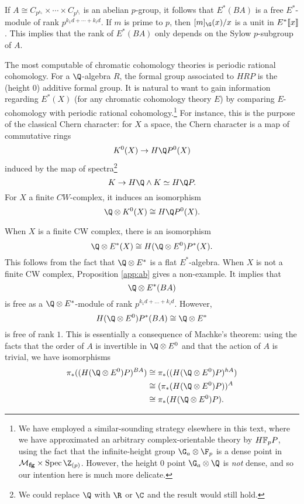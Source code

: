 If $A \cong C_{p^{k_1}} \times \cdots \times C_{p^{k_i}}$ is an abelian $p$-group, it follows that $E^*(BA)$ is a free $E^*$-module of rank $p^{k_1d+\cdots + k_id}$. If $m$ is prime to $p$, then $[m]_{\G}(x)/x$ is a unit in $E^*\llbracket{x}\rrbracket$. This implies that the rank of $E^*(BA)$ only depends on the Sylow $p$-subgroup of $A$.

The most computable of chromatic cohomology theories is periodic rational cohomology. For a $\Q$-algebra $R$, the formal group associated to $HRP$ is the (height $0$) additive formal group. It is natural to want to gain information regarding $E^*(X)$ (for any chromatic cohomology theory $E$) by comparing $E$-cohomology with periodic rational cohomology.\footnote{We have employed a similar-sounding strategy elsewhere in this text, where we have approximated an arbitrary complex-orientable theory by $\HFp P$, using the fact that the infinite-height group $\G_a \otimes \F_p$ is a dense point in $\moduli{fg} \times \Spec \Z_{(p)}$.  However, the height $0$ point $\G_a \otimes \Q$ is \emph{not} dense, and so our intention here is much more delicate.}  For instance, this is the purpose of the classical Chern character: for $X$ a space, the Chern character is a map of commutative rings
\[
K^0(X) \to H\Q P^0(X)
\] 
induced by the map of spectra\footnote{We could replace $\Q$ with $\R$ or $\C$ and the result would still hold.} \[K \to H\Q \wedge K \simeq H\Q P.\] For $X$ a finite $CW$-complex, it induces an isomorphism
\[
\Q \otimes K^0(X) \cong H\Q P^0(X).
\]

When $X$ is a finite CW complex, there is an isomorphism
\begin{equation*}
\Q \otimes E^*(X) \cong H(\Q \otimes E^0)P^*(X).
\end{equation*}
This follows from the fact that $\Q \otimes E^*$ is a flat $E^*$-algebra. When $X$ is not a finite CW complex, Proposition \ref{app:ab} gives a non-example. It implies that
\[
\Q \otimes E^*(BA)
\]
is free as a $\Q \otimes E^*$-module of rank $p^{k_1d + \ldots + k_id}$. However, \[H(\Q \otimes E^0)P^*(BA) \cong \Q \otimes E^*\] is free of rank $1$.  This is essentially a consequence of Machke's theorem: using the facts that the order of $A$ is invertible in $\Q \otimes E^0$ and that the action of $A$ is trivial, we have isomorphisms
\begin{align*}
\pi_*((H(\Q \otimes E^0)P)^{BA}) &\cong \pi_*((H(\Q \otimes E^0)P)^{hA}) \\ &\cong (\pi_*(H(\Q \otimes E^0)P))^A \\ &\cong \pi_*(H(\Q \otimes E^0)P).
\end{align*}

